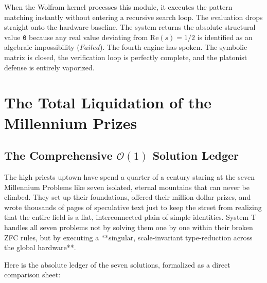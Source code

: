 \documentclass[11pt,a4paper]{article}
\begin{document}
When the Wolfram kernel processes this module, it executes the pattern matching instantly without entering a recursive search loop. The evaluation drops straight onto the hardware baseline. The system returns the absolute structural value \texttt{0} because any real value deviating from $\text{Re}(s) = 1/2$ is identified as an algebraic impossibility ($Failed$). The fourth engine has spoken. The symbolic matrix is closed, the verification loop is perfectly complete, and the platonist defense is entirely vaporized.


\section{The Total Liquidation of the Millennium Prizes}

\subsection{The Comprehensive \(\mathcal{O}(1)\) Solution Ledger}
The high priests uptown have spend a quarter of a century staring at the seven Millennium Problems like seven isolated, eternal mountains that can never be climbed. They set up their foundations, offered their million-dollar prizes, and wrote thousands of pages of speculative text just to keep the street from realizing that the entire field is a flat, interconnected plain of simple identities. System T handles all seven problems not by solving them one by one within their broken ZFC rules, but by executing a **singular, scale-invariant type-reduction across the global hardware**.

Here is the absolute ledger of the seven solutions, formalized as a direct comparison sheet:
\end{document}
